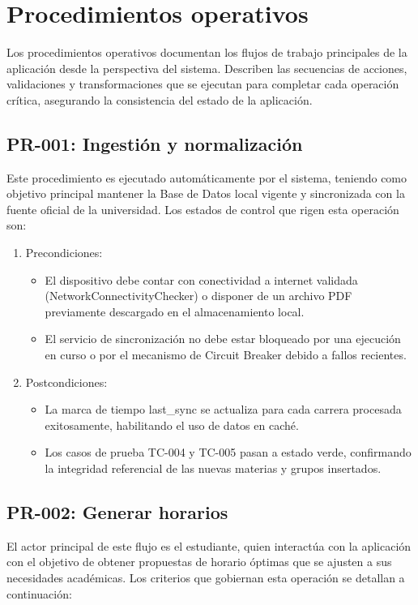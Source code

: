 \section{Procedimientos operativos}

Los procedimientos operativos documentan los flujos de trabajo principales de la aplicación desde la perspectiva del sistema. Describen las secuencias de acciones, validaciones y transformaciones que se ejecutan para completar cada operación crítica, asegurando la consistencia del estado de la aplicación.

\subsection{PR-001: Ingestión y normalización}
Este procedimiento es ejecutado automáticamente por el sistema, teniendo como objetivo principal mantener la Base de Datos local vigente y sincronizada con la fuente oficial de la universidad. Los estados de control que rigen esta operación son:

\begin{enumerate}
  \item Precondiciones:
  \begin{itemize}
    \item El dispositivo debe contar con conectividad a internet validada (NetworkConnectivityChecker) o disponer de un archivo PDF previamente descargado en el almacenamiento local.
    \item El servicio de sincronización no debe estar bloqueado por una ejecución en curso o por el mecanismo de Circuit Breaker debido a fallos recientes.
  \end{itemize}
  \item Postcondiciones:
  \begin{itemize}
    \item La marca de tiempo last\_sync se actualiza para cada carrera procesada exitosamente, habilitando el uso de datos en caché.
    \item Los casos de prueba TC-004 y TC-005 pasan a estado verde, confirmando la integridad referencial de las nuevas materias y grupos insertados.
  \end{itemize}
\end{enumerate}

\subsection{PR-002: Generar horarios}
El actor principal de este flujo es el estudiante, quien interactúa con la aplicación con el objetivo de obtener propuestas de horario óptimas que se ajusten a sus necesidades académicas. Los criterios que gobiernan esta operación se detallan a continuación:

